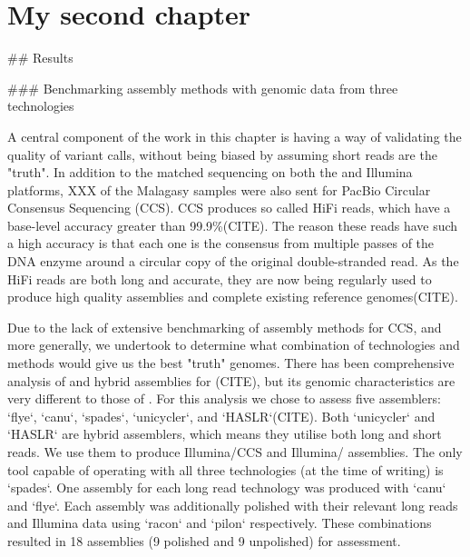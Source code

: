 
\chapter{My second chapter}

\ifpdf
    \graphicspath{{Chapter2/Figs/Raster/}{Chapter2/Figs/PDF/}{Chapter2/Figs/}}
\else
    \graphicspath{{Chapter2/Figs/Vector/}{Chapter2/Figs/}}
\fi

\begin{markdown}

## Results

### Benchmarking assembly methods with genomic data from three technologies 

A central component of the work in this chapter is having a way of validating the quality of variant calls, without being biased by assuming short reads are the "truth". In addition to the matched sequencing on both the \ont{} and Illumina platforms, XXX of the Malagasy samples were also sent for PacBio Circular Consensus Sequencing (CCS). CCS produces so called HiFi reads, which have a base-level accuracy greater than 99.9\%(CITE). The reason these reads have such a high accuracy is that each one is the consensus from multiple passes of the DNA enzyme around a circular copy of the original double-stranded read. As the HiFi reads are both long and accurate, they are now being regularly used to produce high quality \denovo{} assemblies and complete existing reference genomes(CITE).  

Due to the lack of extensive benchmarking of assembly methods for CCS, and \mtb{} more generally, we undertook to determine what combination of technologies and methods would give us the best "truth" genomes. There has been comprehensive analysis of \ont{} and hybrid assemblies for \ecoli{}(CITE), but its genomic characteristics are very different to those of \mtb{}. For this analysis we chose to assess five assemblers: `flye`, `canu`, `spades`, `unicycler`, and `HASLR`(CITE). Both `unicycler` and `HASLR` are hybrid assemblers, which means they utilise both long and short reads. We use them to produce Illumina/CCS and Illumina/\ont{} assemblies. The only tool capable of operating with all three technologies (at the time of writing) is `spades`. One assembly for each long read technology was produced with `canu` and `flye`.  
Each assembly was additionally polished with their relevant long reads and Illumina data using `racon` and `pilon` respectively. These combinations resulted in 18 assemblies (9 polished and 9 unpolished) for assessment.  


\end{markdown}

